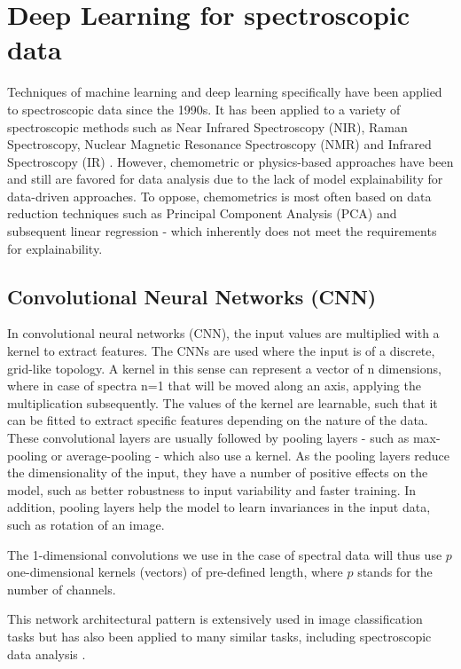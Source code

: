 \label{DL_theory}
\section{Deep Learning for spectroscopic data}

Techniques of machine learning and deep learning specifically have been applied to spectroscopic data since the 1990s. It has been applied to a variety of spectroscopic methods such as Near Infrared Spectroscopy (NIR), Raman Spectroscopy, Nuclear Magnetic Resonance Spectroscopy (NMR) and Infrared Spectroscopy (IR) . However, chemometric or physics-based approaches have been and still are favored for data analysis due to the lack of model explainability for data-driven approaches. To oppose, chemometrics is most often based on data reduction techniques such as Principal Component Analysis (PCA) and subsequent linear regression - which inherently does not meet the requirements for explainability.





\subsection{Convolutional Neural Networks (CNN)}

In convolutional neural networks (CNN), the input values are multiplied with a kernel to extract features. The CNNs are used where the input is of a discrete, grid-like topology. A kernel in this sense can represent a vector of n dimensions, where in case of spectra n=1 that will be moved along an axis, applying the multiplication subsequently. The values of the kernel are learnable, such that it can be fitted to extract specific features depending on the nature of the data. 
These convolutional layers are usually followed by pooling layers - such as max-pooling or average-pooling - which also use a kernel. As the pooling layers reduce the dimensionality of the input, they have a number of positive effects on the model, such as better robustness to input variability and faster training. In addition, pooling layers help the model to learn invariances in the input data, such as rotation of an image. 

The 1-dimensional convolutions we use in the case of spectral data will thus use $p$ one-dimensional kernels (vectors) of pre-defined length, where $p$ stands for the number of channels.

This network architectural pattern is extensively used in image classification tasks but has also been applied to many similar tasks, including spectroscopic data analysis \cite{sun_cnnlstm_2023, castorena_deep_2021, drera_deep_2019}.

